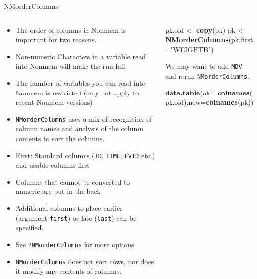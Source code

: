 \documentclass[
  8pt,
  ignorenonframetext,
  aspectratio=169]{beamer}
\newenvironment{Shaded}{\begin{snugshade}}{\end{snugshade}}
\newcommand{\DataTypeTok}[1]{\textcolor[rgb]{0.13,0.29,0.53}{#1}}
\newcommand{\KeywordTok}[1]{\textcolor[rgb]{0.13,0.29,0.53}{\textbf{#1}}}
\newcommand{\NormalTok}[1]{#1}
\newcommand{\StringTok}[1]{\textcolor[rgb]{0.31,0.60,0.02}{#1}}
\begin{document}
\begin{frame}[fragile]{NMorderColumns}
\protect\hypertarget{nmordercolumns}{}
\begin{columns}[T]
\begin{column}{0.48\textwidth}
\vspace{12pt}

\begin{itemize}
\item
  The order of columns in Nonmem is important for two reasons.
\item
  Non-numeric Characters in a variable read into Nonmem will make the
  run fail
\item
  The number of variables you can read into Nonmem is restricted (may
  not apply to recent Nonmem versions)
\item
  \texttt{NMorderColumns} uses a mix of recognition of column names and
  analysis of the column contents to sort the columns.
\item
  First: Standard columns (\texttt{ID}, \texttt{TIME}, \texttt{EVID}
  etc.) and usable columns first
\item
  Columns that cannot be converted to numeric are put in the back
\item
  Additional columns to place earlier (argument \texttt{first}) or late
  (\texttt{last}) can be specified.
\item
  See \texttt{?NMorderColumns} for more options.
\item
  \texttt{NMorderColumns} does not sort rows, nor does it modify any
  contents of columns.
\end{itemize}
\end{column}

\begin{column}{0.48\textwidth}
\footnotesize

\begin{Shaded}
\begin{Highlighting}[]
\NormalTok{pk.old \textless{}{-}}\StringTok{ }\KeywordTok{copy}\NormalTok{(pk)}
\NormalTok{pk \textless{}{-}}\StringTok{ }\KeywordTok{NMorderColumns}\NormalTok{(pk,}\DataTypeTok{first=}\StringTok{"WEIGHTB"}\NormalTok{)}
\end{Highlighting}
\end{Shaded}

\normalsize

We may want to add \texttt{MDV} and rerun \texttt{NMorderColumns}.
\footnotesize

\begin{Shaded}
\begin{Highlighting}[]
\KeywordTok{data.table}\NormalTok{(}\DataTypeTok{old=}\KeywordTok{colnames}\NormalTok{(pk.old),}\DataTypeTok{new=}\KeywordTok{colnames}\NormalTok{(pk))}
\end{Highlighting}
\end{Shaded}


\end{column}
\end{columns}
\end{frame}
\end{document}
